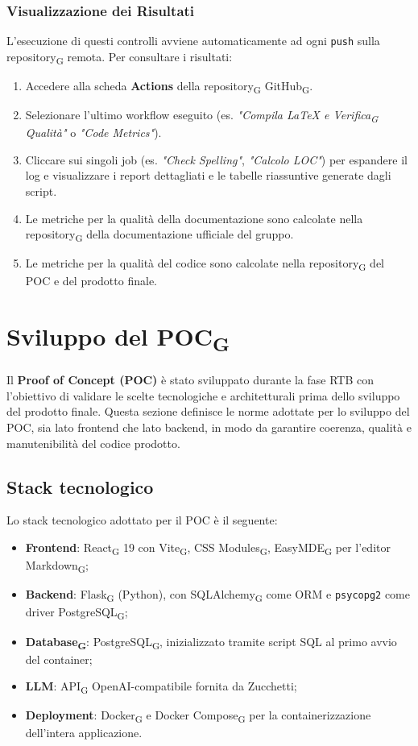 \documentclass[11pt,a4paper]{article}
\newcommand{\gls}[1]{#1\textsubscript{G}}
\begin{document}
\subsubsection{Visualizzazione dei Risultati}
L'esecuzione di questi controlli avviene automaticamente ad ogni \texttt{push} sulla \gls{repository} remota. Per consultare i risultati:
\begin{enumerate}
    \item Accedere alla scheda \textbf{Actions} della \gls{repository} \gls{GitHub}.
    \item Selezionare l'ultimo workflow eseguito (es. \textit{"Compila LaTeX e \gls{Verifica} Qualità"} o \textit{"Code Metrics"}).
    \item Cliccare sui singoli job (es. \textit{"Check Spelling"}, \textit{"Calcolo LOC"}) per espandere il log e visualizzare i report dettagliati e le tabelle riassuntive generate dagli script.
    \item Le metriche per la qualità della documentazione sono calcolate nella \gls{repository} della documentazione ufficiale del gruppo.
    \item Le metriche per la qualità del codice sono calcolate nella \gls{repository} del POC e del prodotto finale.
\end{enumerate}


\newpage
 
\section{Sviluppo del \gls{POC}}
 
Il \textbf{Proof of Concept (POC)} è stato sviluppato durante la fase RTB con l'obiettivo di validare le scelte tecnologiche e architetturali prima dello sviluppo del prodotto finale. Questa sezione definisce le norme adottate per lo sviluppo del POC, sia lato frontend che lato backend, in modo da garantire coerenza, qualità e manutenibilità del codice prodotto.
 
\subsection{Stack tecnologico}
Lo stack tecnologico adottato per il POC è il seguente:
\begin{itemize}
    \item \textbf{Frontend}: \gls{React} 19 con \gls{Vite}, \gls{CSS Modules}, \gls{EasyMDE} per l'editor \gls{Markdown};
    \item \textbf{Backend}: \gls{Flask} (Python), con \gls{SQLAlchemy} come ORM e \texttt{psycopg2} come driver \gls{PostgreSQL};
    \item \textbf{\gls{Database}}: \gls{PostgreSQL}, inizializzato tramite script SQL al primo avvio del container;
    \item \textbf{LLM}: \gls{API} OpenAI-compatibile fornita da Zucchetti;
    \item \textbf{Deployment}: \gls{Docker} e \gls{Docker Compose} per la containerizzazione dell'intera applicazione.
\end{itemize}
 
\end{document}
